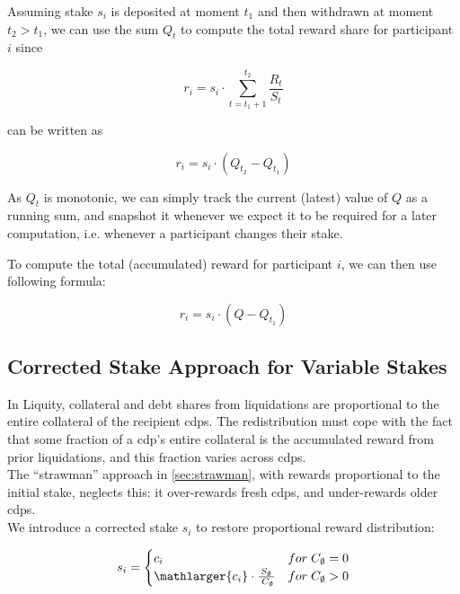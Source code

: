 \documentclass[reqno]{article}
\begin{document}
Assuming stake $s_i$ is deposited at moment $t_1$ and then
withdrawn at moment $t_2 > t_1$, we can use the sum $Q_t$ to
compute the total reward share for participant $i$ since


\begin{equation} 
    r_i = s_i \cdot \sum\limits_{t=t_1+1}^{t_2}\frac{R_t}{S_t}
\end{equation}

can be written as

\begin{equation} 
    r_i = s_i \cdot (Q_{t_2} - Q_{t_1})
\end{equation}

As $Q_t$ is monotonic, we can simply track the current (latest)
value of $Q$ as a running sum, and snapshot it whenever we expect it to be required for a later computation, i.e. whenever a participant changes their stake.

To compute the total (accumulated) reward for participant $i$, we can then use following formula:

\begin{equation} 
    r_i = s_i \cdot (Q - Q_{t_1})
\end{equation}

\bigskip

\subsection{Corrected Stake Approach for Variable Stakes}
In Liquity, collateral and debt shares from liquidations are proportional to the entire collateral of the recipient cdps. The redistribution must cope with the fact that some fraction of a cdp's entire collateral is the accumulated reward from prior liquidations, and this fraction varies across cdps. \\

The “strawman” approach in \ref{sec:strawman}, with rewards proportional to the initial stake, neglects this: it over-rewards fresh cdps, and under-rewards older cdps. \\

We introduce a corrected stake $s_i$ to restore proportional reward distribution:

\begin{equation} \label{eq:2}
    s_i=
        \begin{cases} 
            c_i & for \;C_\emptyset = 0\\
            \mathlarger{c_i} \cdot \frac{S_\emptyset} {\;C_\emptyset} & for \;C_\emptyset>0
        \end{cases}
\end{equation}
\end{document}
